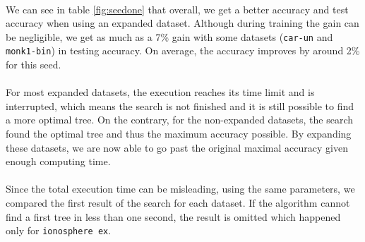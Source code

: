 \documentclass[12pt]{report}
\theoremstyle{definition}
\theoremstyle{definition}
\theoremstyle{definition}
\begin{document}
\paragraph{} We can see in table \ref{fig:seedone} that overall, we get a better accuracy and test accuracy when using
an expanded dataset. Although during training the gain can be negligible, we get as much as a 7\% gain with some datasets 
(\texttt{car-un} and \texttt{monk1-bin}) in testing accuracy. On average, the accuracy improves by around 2\% for this
seed.

\paragraph{} For most expanded datasets, the execution reaches its time limit and is interrupted, which means the search
is not finished and it is still possible to find a more optimal tree. On the contrary, for the non-expanded datasets,
the search found the optimal tree and thus the maximum accuracy possible. By expanding these datasets, we are now able to
go past the original maximal accuracy given enough computing time.

\paragraph{} Since the total execution time can be misleading, using the same parameters, we compared the first result
of the search for each dataset. If the algorithm cannot find a first tree in less than one second, the result is
omitted which happened only for \texttt{ionosphere ex}.
\end{document}
